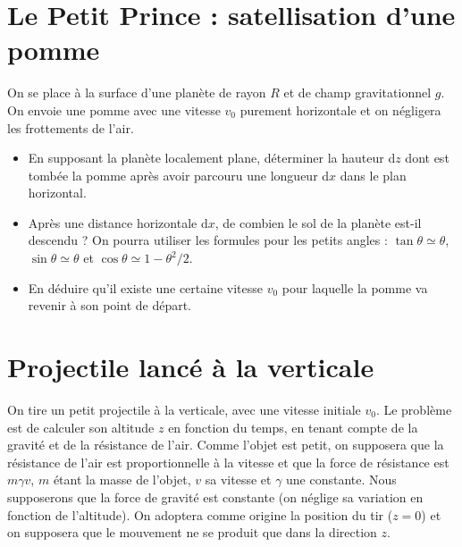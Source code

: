 \documentclass{report}
\begin{document}
\section*{Le Petit Prince : satellisation d'une pomme}

On se place à la surface d'une planète de rayon $R$ et de champ gravitationnel $g$. On envoie une pomme avec une vitesse $v_0$ purement horizontale et on négligera les frottements de l'air.

\begin{itemize}
\item En supposant la planète localement plane, déterminer la hauteur d$z$ dont est tombée la pomme après avoir parcouru une longueur d$x$ dans le plan horizontal. %
\item Après une distance horizontale d$x$, de combien le sol de la planète est-il descendu ? On pourra utiliser les formules pour les petits angles : $\tan\theta\simeq \theta$, $\sin\theta\simeq \theta$ et $\cos\theta\simeq 1-\theta^2/2$. %
\item En déduire qu'il existe une certaine vitesse $v_0$ pour laquelle la pomme va revenir à son point de départ. %
\end{itemize}

\newpage

\section*{Projectile lancé à la verticale}

On tire un petit projectile à la verticale, avec une vitesse initiale $v_0$. Le problème est de calculer son altitude $z$ en fonction du temps, en tenant compte de la gravité et de la résistance de l'air. Comme l'objet est petit, on supposera que la résistance de l'air est proportionnelle à la vitesse et que la force de résistance est $m\gamma v$, $m$ étant la masse de l'objet, $v$ sa vitesse et $\gamma$ une constante. Nous supposerons que la force de gravité est constante (on néglige sa variation en fonction de l'altitude). On adoptera comme origine la position du tir ($z=0$) et on supposera que le mouvement ne se produit que dans la direction $z$.
\end{document}
